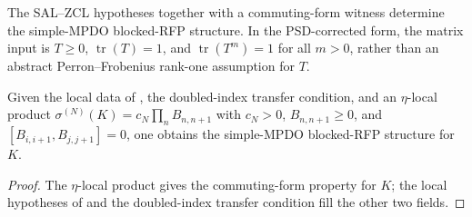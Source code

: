 \begin{theorem}
    \label{thm:simple_mpdo_blocked_rfp_data_of_sal_zcl_and_commuting_form}
    \leanok
    The SAL--ZCL hypotheses together with a commuting-form witness determine
    the simple-MPDO blocked-RFP structure. In the PSD-corrected form, the
    matrix input is $T\ge0$, $\operatorname{tr}(T)=1$, and
    $\operatorname{tr}(T^m)=1$ for all $m>0$, rather than an abstract
    Perron--Frobenius rank-one assumption for $T$.
\end{theorem}

\begin{theorem}
    \label{thm:simple_mpdo_blocked_rfp_data_of_eta_local_structure}
    \leanok
    Given the local data of \cite[Appendix~C.2]{Cirac2016MPDO_arXiv}, the
    doubled-index transfer condition, and an $\eta$-local product
    $\sigma^{(N)}(K)=c_N\prod_n B_{n,n+1}$ with $c_N>0$,
    $B_{n,n+1}\ge0$, and $[B_{i,i+1},B_{j,j+1}]=0$, one obtains the
    simple-MPDO blocked-RFP structure for $K$.
\end{theorem}

\begin{proof}\leanok
    The $\eta$-local product gives the commuting-form property for $K$; the
    local hypotheses of \cite[Appendix~C.2]{Cirac2016MPDO_arXiv} and the
    doubled-index transfer condition fill the other two fields.
\end{proof}

